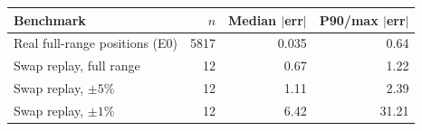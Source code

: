 \begin{tabular}{@{}lrrr@{}}
\toprule
Benchmark & $n$ & Median $|$err$|$ & P90/max $|$err$|$ \\
\midrule
Real full-range positions (E0) & 5817 & 0.035 & 0.64 \\
Swap replay, full range & 12 & 0.67 & 1.22 \\
Swap replay, $\pm5\%$ & 12 & 1.11 & 2.39 \\
Swap replay, $\pm1\%$ & 12 & 6.42 & 31.21 \\
\bottomrule
\end{tabular}
